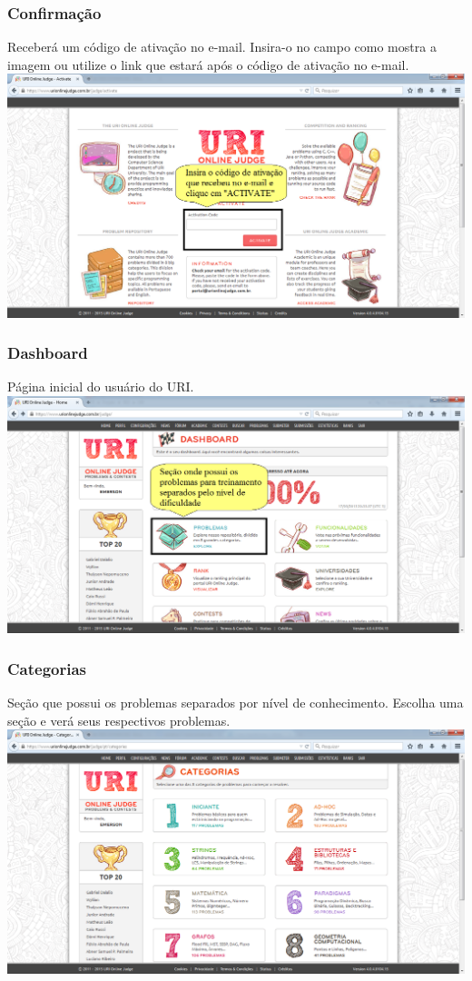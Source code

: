 \begin{frame}
  \frametitle{Confirmação}
Receberá um código de ativação no e-mail. Insira-o no campo como mostra a imagem
ou utilize o link que estará após o código de ativação no e-mail.
 \includegraphics[scale=.28]{uri/Imagens/03Confirmacao.png}
\end{frame}

\begin{frame}
 \frametitle{Dashboard}
 Página inicial do usuário do URI.
 \includegraphics[scale=.28]{uri/Imagens/04Dashboard.png}
\end{frame}

\begin{frame}
 \frametitle{Categorias}
 Seção que possui os problemas separados por nível de conhecimento.
 Escolha uma seção e verá seus respectivos problemas.
 \includegraphics[scale=.28]{uri/Imagens/05Categorias.png}
\end{frame}

